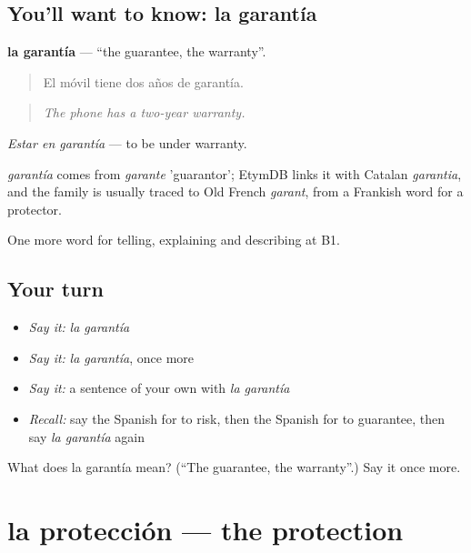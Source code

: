 \subsection*{You'll want to know: la garantía}
\textbf{la garantía} — \textquotedblleft{}the guarantee, the warranty\textquotedblright{}.

\begin{quote}
El móvil tiene dos años de garantía.
\end{quote}

\begin{quote}
\emph{The phone has a two-year warranty.}
\end{quote}

\emph{Estar en garantía} — to be under warranty.

\begin{cousinweb}
\emph{garantía} comes from \emph{garante} 'guarantor'; EtymDB links it with Catalan \emph{garantia}, and the family is usually traced to Old French \emph{garant}, from a Frankish word for a protector.
\end{cousinweb}

\begin{grammarlens}[title={What you've built}]
One more word for telling, explaining and describing at B1.
\end{grammarlens}

\subsection*{Your turn}
\begin{itemize}
\raggedright
  \item \emph{Say it:} \emph{la garantía}
  \item \emph{Say it:} \emph{la garantía}, once more
  \item \emph{Say it:} a sentence of your own with \emph{la garantía}
  \item \emph{Recall:} say the Spanish for to risk, then the Spanish for to guarantee, then say \emph{la garantía} again
\end{itemize}

\begin{tcolorbox}[breakable,colback=teal!4,colframe=teal!35!black,title={Before you move on}]
What does la garantía mean? (\textquotedblleft{}The guarantee, the warranty\textquotedblright{}.) Say it once more.
\end{tcolorbox}
\section[la protección]{la protección — the protection}

